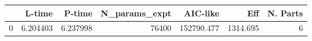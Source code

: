 \begin{tabular}{lrrrrrr}
\toprule
{} &    L-time &    P-time &  N\_params\_expt &    AIC-like &       Eff &  N. Parts \\
\midrule
0 &  6.204403 &  6.237998 &          76400 &  152790.477 &  1314.695 &         6 \\
\bottomrule
\end{tabular}
